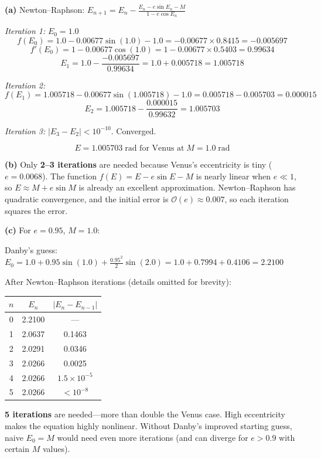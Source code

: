 \documentclass[11pt,letterpaper]{article}
\begin{document}
\begin{solution}
\textbf{(a)} Newton–Raphson: $E_{n+1} = E_n - \frac{E_n - e\sin E_n - M}{1 - e\cos E_n}$

\textit{Iteration 1:}
$E_0 = 1.0$
\[
  f(E_0) = 1.0 - 0.00677\sin(1.0) - 1.0
  = -0.00677 \times 0.8415 = -0.005697
\]
\[
  f'(E_0) = 1 - 0.00677\cos(1.0) = 1 - 0.00677 \times 0.5403 = 0.99634
\]
\[
  E_1 = 1.0 - \frac{-0.005697}{0.99634} = 1.0 + 0.005718 = 1.005718
\]

\textit{Iteration 2:}
\[
  f(E_1) = 1.005718 - 0.00677\sin(1.005718) - 1.0
  = 0.005718 - 0.005703 = 0.000015
\]
\[
  E_2 = 1.005718 - \frac{0.000015}{0.99632} = 1.005703
\]

\textit{Iteration 3:}
$|E_3 - E_2| < 10^{-10}$. Converged.

\[
  \boxed{E = 1.005703\;\text{rad for Venus at}\;M = 1.0\;\text{rad}}
\]

\textbf{(b)} Only \textbf{2–3 iterations} are needed because
Venus's eccentricity is tiny ($e = 0.0068$). The function
$f(E) = E - e\sin E - M$ is nearly linear when $e \ll 1$, so
$E \approx M + e\sin M$ is already an excellent approximation.
Newton–Raphson has quadratic convergence, and the initial error
is $\mathcal{O}(e) \approx 0.007$, so each iteration squares
the error.

\textbf{(c)} For $e = 0.95$, $M = 1.0$:

Danby's guess: $E_0 = 1.0 + 0.95\sin(1.0) + \frac{0.95^2}{2}\sin(2.0)
= 1.0 + 0.7994 + 0.4106 = 2.2100$

After Newton–Raphson iterations (details omitted for brevity):
\begin{center}
\begin{tabular}{ccc}
  \toprule
  $n$ & $E_n$ & $|E_n - E_{n-1}|$ \\
  \midrule
  0 & 2.2100 & — \\
  1 & 2.0637 & 0.1463 \\
  2 & 2.0291 & 0.0346 \\
  3 & 2.0266 & 0.0025 \\
  4 & 2.0266 & $1.5 \times 10^{-5}$ \\
  5 & 2.0266 & $< 10^{-8}$ \\
  \bottomrule
\end{tabular}
\end{center}

\textbf{5 iterations} are needed—more than double the Venus case.
High eccentricity makes the equation highly nonlinear. Without
Danby's improved starting guess, naive $E_0 = M$ would need even
more iterations (and can diverge for $e > 0.9$ with certain $M$
values).
\end{solution}
\end{document}
